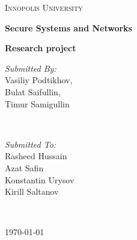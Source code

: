 \documentclass[12pt,a4paper]{report}
\begin{document}
\begin{titlepage}
	\centering
	{\scshape\LARGE Innopolis University \par}
	\vspace{1cm}
	{\huge\bfseries Secure Systems and Networks\par}
	{\huge\bfseries Research project\par}
	\vspace{2cm}
	\vfill

\begin{minipage}{0.4\textwidth}
\begin{flushleft} \large
\emph{Submitted By:}
\\Vasiliy Podtikhov,
\\Bulat Saifullin,
\\Timur Samigullin
\end{flushleft}
\end{minipage}
~
\begin{minipage}{0.4\textwidth}
\begin{flushright} \large
\emph{Submitted To:}
\\Rasheed Hussain
\\Azat Safin
\\Konstantin Urysov
\\Kirill Saltanov
\end{flushright}
\end{minipage}\\[1cm]


	\vfill
	{\large \today\par}
\end{titlepage}

\begin{abstract}
In modern day social networks become widely used. Practically almost all employers using them. But they can be used to formating public opinion in way not acceptable by company, or by accident share some confidentially information. This often happened because ordinary employee don't unaware of global company goals.

In this work we will try to link a social identity to an IP address by analysis of user traffics. This will help us to establish leakage, find disgruntled employees and change company politics to prevent this situations.
\end{abstract}
\end{document}
